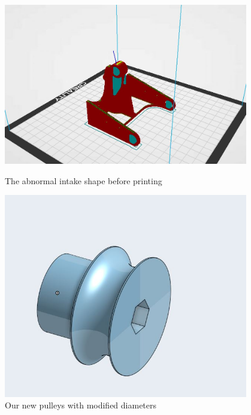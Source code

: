 \begin{figure}[ht]
\centering
\begin{minipage}[b]{.48\textwidth}
  \centering
  \includegraphics[width=0.95\textwidth]{Meetings/November/11-23-21/10-23-21_Hardware_Figure1 - Nathan Forrer.JPG}
  \caption{The abnormal intake shape before printing}
  \label{fig:112321_1}
\end{minipage}%
\hfill%
\begin{minipage}[b]{.48\textwidth}
  \centering
  \includegraphics[width=0.95\textwidth]{Meetings/November/11-23-21/10-23-21_Hardware_Figure2 - Nathan Forrer.JPG}
  \caption{Our new pulleys with modified diameters}
  \label{fig:112321_2}
\end{minipage}
\end{figure}

